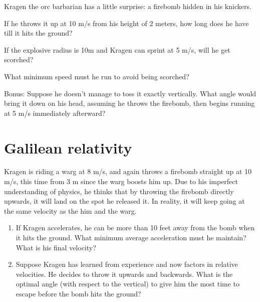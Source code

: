 \documentclass[12pt,letterpaper]{article}
\begin{document}
Kragen the orc barbarian has a little surprise:
a firebomb hidden in his knickers.

If he throws it up at 10 m/s from his height of 2 meters,
how long does he have till it hits the ground?

If the explosive radius is 10m and Kragen can sprint at 5 m/s, will he get scorched?

What minimum speed must he run to avoid being scorched?

Bonus:
Suppose he doesn't manage to toss it exactly vertically. 
What angle would bring it down on his head,
assuming he throws the firebomb,
then begins running at 5 m/s immediately afterward?

\section{Galilean relativity}

Kragen is riding a warg at 8 m/s,
and again throws a firebomb straight up at 10 m/s,
this time from 3 m since the warg boosts him up.
Due to his imperfect understanding of physics,
he thinks that by throwing the firebomb directly upwards,
it will land on the spot he released it.
In reality, it will keep going at the same velocity as the him and the warg.

\begin{enumerate}
\item If Kragen accelerates, he can be more than 10 feet away from the bomb when it hits the ground. What minimum average acceleration must he maintain? What is his final velocity?
\item Suppose Kragen has learned from experience and now factors in relative velocities. He decides to throw it upwards and backwards. What is the optimal angle (with respect to the vertical) to give him the most time to escape before the bomb hits the ground?
\end{enumerate}
\end{document}
